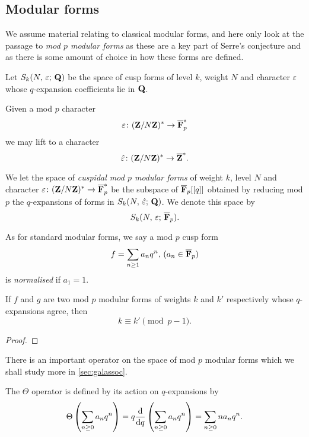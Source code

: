 \documentclass[a4paper,12pt]{article}
\begin{document}
\subsection{Modular forms}
We assume material relating to classical modular forms, and here only look at the passage to \emph{mod $p$ modular forms} as these are a key part of Serre's conjecture and as there is some amount of choice in how these forms are defined.

\begin{defn} %
Let $S_k(N,\,\varepsilon;\,\mathbf{Q})$ be the space of cusp forms of level $k$, weight $N$ and character $\varepsilon$ whose $q$-expansion coefficients lie in $\mathbf{Q}$.

Given a mod $p$ character
\[
\varepsilon\colon (\mathbf{Z}/N\mathbf{Z})^* \to \overline{\mathbf{F}}_p^*
\]
we may lift to a character
\[
\hat{\varepsilon}\colon (\ZZ/N\ZZ)^* \to \Zb^*. %
\]

We let the space of \emph{cuspidal mod $p$ modular forms} of weight $k$, level $N$ and character $\varepsilon\colon (\mathbf{Z}/N\mathbf{Z})^* \to \overline{\mathbf{F}}_p^*$ be the subspace of $\overline{\mathbf{F}}_p[[q]]$ obtained by reducing mod $p$ the $q$-expansions of forms in $S_k(N,\,\hat{\varepsilon};\,\mathbf{Q})$.
We denote this space by
\[
S_k(N,\,\varepsilon;\,\overline{\mathbf{F}}_p).
\]
\end{defn}

\begin{defn}
As for standard modular forms, we say a mod $p$ cusp form
\[
f = \sum_{n\ge 1} a_n q^n,\,(a_n\in\overline{\mathbf{F}}_p)
\]
is \emph{normalised} if $a_1 = 1$.
\end{defn}

\begin{ex}
\end{ex}

\begin{prop}\label{prop:pm1}
If $f$ and $g$ are two mod $p$ modular forms of weights $k$ and $k'$ respectively whose $q$-expansions agree, then
\[
k \equiv k' \pmod{p-1}.
\]
\end{prop}
\begin{proof}
\end{proof}

There is an important operator on the space of mod $p$ modular forms which we shall study more in \cref{sec:galassoc}.

\begin{defn}\label{def:theta}
The $\Theta$ operator is defined by its action on $q$-expansions by
\[
\Theta\left(\sum_{n\ge 0} a_nq^n\right) = q\frac{\mathrm{d}}{\mathrm{d}q} \left(\sum_{n\ge 0} a_nq^n\right) = \sum_{n\ge 0} na_nq^n.
\]
\end{defn}
\end{document}

